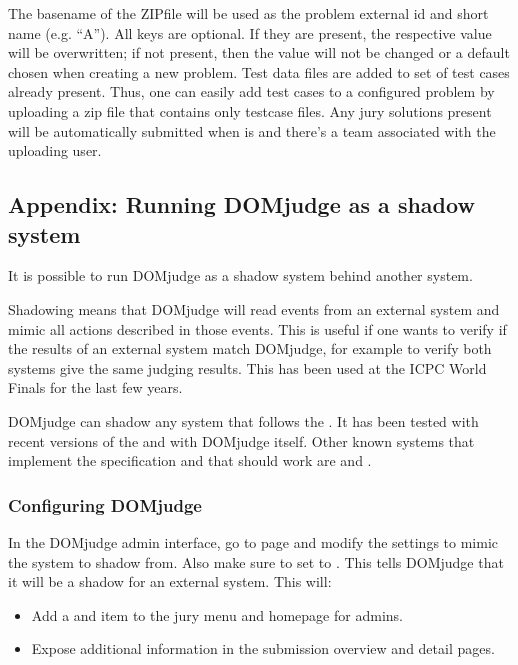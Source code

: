 \documentclass[a4paper,10pt,english,openany]{sphinxmanual}
\begin{document}
\sphinxAtStartPar
The basename of the ZIP\sphinxhyphen{}file will be used as the problem external id and short
name (e.g. “A”). All keys are optional. If they are present, the respective
value will be overwritten; if not present, then the value will not be changed
or a default chosen when creating a new problem. Test data files are added to
set of test cases already present. Thus, one can easily add test cases to a
configured problem by uploading a zip file that contains only testcase files.
Any jury solutions present will be automatically submitted when 
is  and there’s a team associated with the uploading user.

\sphinxstepscope


\subsection{Appendix: Running DOMjudge as a shadow system}
\label{\detokenize{shadow:appendix-running-domjudge-as-a-shadow-system}}\label{\detokenize{shadow::doc}}
\sphinxAtStartPar
It is possible to run DOMjudge as a shadow system behind another system.

\sphinxAtStartPar
Shadowing means that DOMjudge will read events from an external system and mimic
all actions described in those events. This is useful if one wants to verify if
the results of an external system match DOMjudge, for example to verify both
systems give the same judging results. This has been used at the ICPC World
Finals for the last few years.

\sphinxAtStartPar
DOMjudge can shadow any system that follows the .
It has been tested with recent versions of the 
and with DOMjudge itself. Other known systems that implement the specification
and that should work are  and .


\subsubsection{Configuring DOMjudge}
\label{\detokenize{shadow:configuring-domjudge}}
\sphinxAtStartPar
In the DOMjudge admin interface, go to  page and modify
the settings to mimic the system to shadow from. Also make sure to set
 to . This tells DOMjudge
that it will be a shadow for an external system. This will:
\begin{itemize}
\item {} 
\sphinxAtStartPar
Add a  and  item to the jury
menu and homepage for admins.

\item {} 
\sphinxAtStartPar
Expose additional information in the submission overview and detail pages.

\end{itemize}
\end{document}
